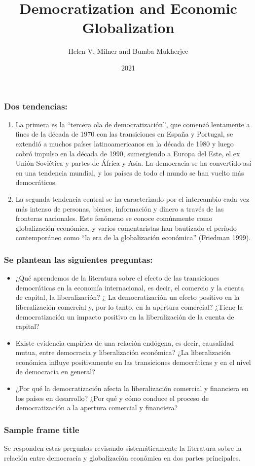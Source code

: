 \documentclass{beamer}
\title{Democratization and Economic Globalization}
\author{Helen V. Milner and Bumba Mukherjee}
\institute{Udelar}
\date{2021}
\begin{document}
\frame{\titlepage}

\begin{frame}
\frametitle{Dos tendencias:}
\begin{enumerate}

\item La primera es la “tercera ola de democratización”, que comenzó lentamente a fines de la década de 1970 con las transiciones en España y Portugal, se extendió a muchos países latinoamericanos en la década de 1980 y luego cobró impulso en la década de 1990, sumergiendo a Europa del Este, el ex Unión Soviética y partes de África y Asia. La democracia se ha convertido así en una tendencia mundial, y los países de todo el mundo se han vuelto más democráticos.
\item La segunda tendencia central se ha caracterizado por el intercambio cada vez más intenso de personas, bienes, información y dinero a través de las fronteras nacionales. Este fenómeno se conoce comúnmente como globalización económica, y varios comentaristas han bautizado el período contemporáneo como “la era de la globalización económica” (Friedman 1999).
\end{enumerate}

\end{frame}

\begin{frame}
\frametitle{Se plantean las siguientes preguntas:}
\begin{itemize}
\item ¿Qué aprendemos de la literatura sobre el efecto de las transiciones democráticas en la economía internacional, es decir, el comercio y la cuenta de capital, la liberalización? ¿ La democratización un efecto positivo en la liberalización comercial y, por lo tanto, en la apertura comercial? ¿Tiene la democratización un impacto positivo en la liberalización de la cuenta de capital?
\item Existe evidencia empírica de una relación endógena, es decir, causalidad mutua, entre democracia y liberalización económica? ¿La liberalización económica influye positivamente en las transiciones democráticas y en el nivel de democracia en general?
\item ¿Por qué la democratización afecta la liberalización comercial y financiera en los países en desarrollo? ¿Por qué y cómo conduce el proceso de democratización a la apertura comercial y financiera?
\end{itemize}
\end{frame}

\begin{frame}
\frametitle{Sample frame title}
Se responden estas preguntas revisando sistemáticamente la literatura sobre la relación entre democracia y globalización económica en dos partes principales.
\end{frame}
\end{document}
